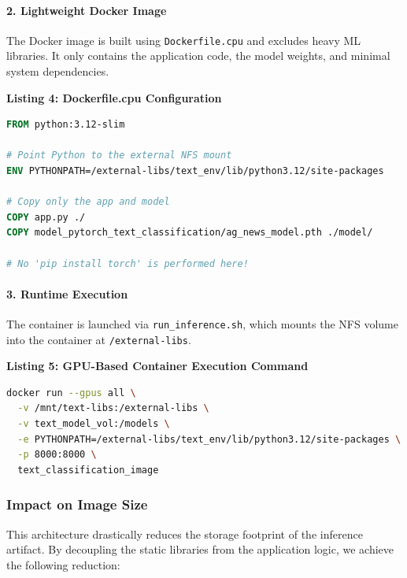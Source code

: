 \documentclass{ieeeaccess}
\begin{document}
\paragraph{2. Lightweight Docker Image}
The Docker image is built using \texttt{Dockerfile.cpu} and excludes heavy ML libraries. It only contains the application code, the model weights, and minimal system dependencies.

\vspace{0.5em}
\noindent\textbf{Listing 4: Dockerfile.cpu Configuration}
\label{lst:dockerfile_cpu}
\vspace{0.3em}

\begin{lstlisting}[language=Dockerfile]
FROM python:3.12-slim

# Point Python to the external NFS mount
ENV PYTHONPATH=/external-libs/text_env/lib/python3.12/site-packages

# Copy only the app and model
COPY app.py ./
COPY model_pytorch_text_classification/ag_news_model.pth ./model/

# No 'pip install torch' is performed here!
\end{lstlisting}

\paragraph{3. Runtime Execution}
The container is launched via \texttt{run\_inference.sh}, which mounts the NFS volume into the container at \texttt{/external-libs}.

\vspace{0.5em}
\noindent\textbf{Listing 5: GPU-Based Container Execution Command}
\label{lst:docker_gpu_run}
\vspace{0.3em}

\begin{lstlisting}[language=bash]
docker run --gpus all \
  -v /mnt/text-libs:/external-libs \
  -v text_model_vol:/models \
  -e PYTHONPATH=/external-libs/text_env/lib/python3.12/site-packages \
  -p 8000:8000 \
  text_classification_image
\end{lstlisting}

\subsubsection{Impact on Image Size}

This architecture drastically reduces the storage footprint of the inference artifact. By decoupling the static libraries from the application logic, we achieve the following reduction:
\end{document}
